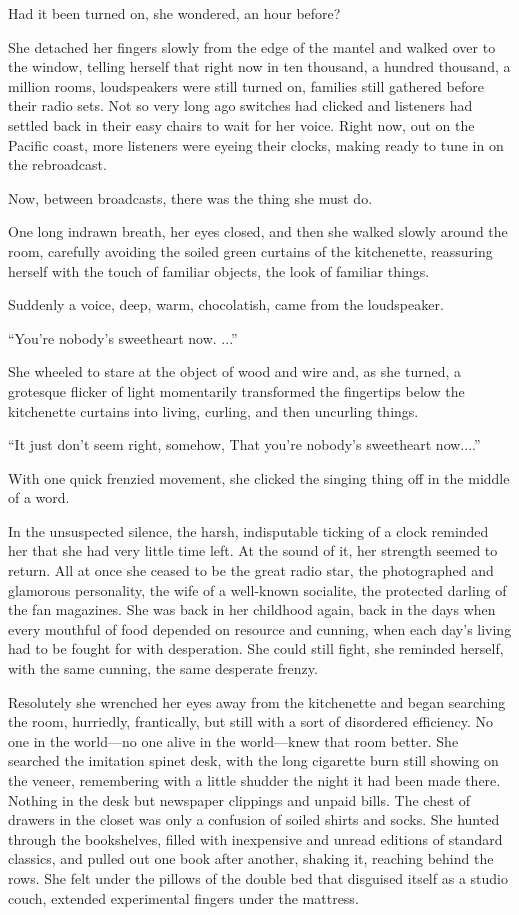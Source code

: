 \documentclass{novel}
\begin{document}
Had it been turned on, she wondered, an hour before?

She detached her fingers slowly from the edge of the mantel and walked over to the window, telling herself that right now in ten thousand, a hundred thousand, a million rooms, loudspeakers were still turned on, families still gathered before their radio sets. Not so very long ago switches had clicked and listeners had settled back in their easy chairs to wait for her voice. Right now, out on the Pacific coast, more listeners were eyeing their clocks, making ready to tune in on the rebroadcast.

Now, between broadcasts, there was the thing she must do.

One long indrawn breath, her eyes closed, and then she walked slowly around the room, carefully avoiding the soiled green curtains of the kitchenette, reassuring herself with the touch of familiar objects, the look of familiar things.

Suddenly a voice, deep, warm, chocolatish, came from the loudspeaker.

“You’re nobody’s sweetheart now. ...”

She wheeled to stare at the object of wood and wire and, as she turned, a grotesque flicker of light momentarily transformed the fingertips below the kitchenette curtains into living, curling, and then uncurling things.

“It just don’t seem right, somehow, That you’re nobody’s sweetheart now....”

With one quick frenzied movement, she clicked the singing thing off in the middle of a word.

In the unsuspected silence, the harsh, indisputable ticking of a clock reminded her that she had very little time left. At the sound of it, her strength seemed to return. All at once she ceased to be the great radio star, the photographed and glamorous personality, the wife of a well-known socialite, the protected darling of the fan magazines. She was back in her childhood again, back in the days when every mouthful of food depended on resource and cunning, when each day’s living had to be fought for with desperation. She could still fight, she reminded herself, with the same cunning, the same desperate frenzy.

Resolutely she wrenched her eyes away from the kitchenette and began searching the room, hurriedly, frantically, but still with a sort of disordered efficiency. No one in the world—no one alive in the world—knew that room better. She searched the imitation spinet desk, with the long cigarette burn still showing on the veneer, remembering with a little shudder the night it had been made there. Nothing in the desk but newspaper clippings and unpaid bills. The chest of drawers in the closet was only a confusion of soiled shirts and socks. She hunted through the bookshelves, filled with inexpensive and unread editions of standard classics, and pulled out one book after another, shaking it, reaching behind the rows. She felt under the pillows of the double bed that disguised itself as a studio couch, extended experimental fingers under the mattress.
\end{document}
